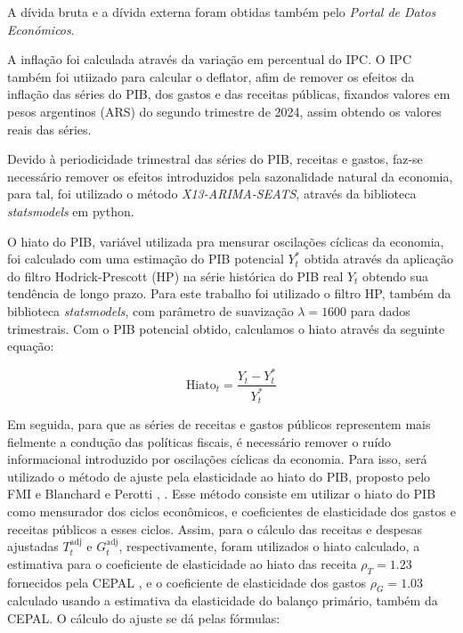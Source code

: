 \documentclass[a4paper, 12pt, openany, oneside, brazil]{abntex2}
\begin{document}
A dívida bruta e a dívida externa foram obtidas também pelo \textit{Portal de Datos Económicos}.

A inflação foi calculada através da variação em percentual do IPC. O IPC também foi utiizado para calcular o deflator, afim de remover os efeitos da inflação das séries do PIB, dos gastos e das receitas públicas, fixandos valores em pesos argentinos (ARS) do segundo trimestre de 2024, assim obtendo os valores reais das séries.

Devido à periodicidade trimestral das séries do PIB, receitas e gastos, faz-se necessário remover os efeitos introduzidos pela sazonalidade natural da economia, para tal, foi utilizado o método \textit{X13-ARIMA-SEATS}, através da biblioteca \textit{statsmodels} em python.

O hiato do PIB, variável utilizada pra mensurar oscilações cíclicas da economia, foi calculado com uma estimação do PIB potencial $Y^*_t$ obtida através da aplicação do filtro Hodrick-Prescott (HP) na série histórica do PIB real $Y_t$ obtendo sua tendência de longo prazo. Para este trabalho foi utilizado o filtro HP, também da biblioteca \textit{statsmodels}, com parâmetro de suavização $\lambda = 1600$ para dados trimestrais. Com o PIB potencial obtido, calculamos o hiato através da seguinte equação:

\begin{equation}
	\text{Hiato}_t = \frac{Y_t - Y^*_t}{Y^*_t}
\end{equation}

Em seguida, para que as séries de receitas e gastos públicos representem mais fielmente a condução das políticas fiscais, é necessário remover o ruído informacional introduzido por oscilações cíclicas da economia. Para isso, será utilizado o método de ajuste pela elasticidade ao hiato do PIB, proposto pelo FMI \cite{fedelino2009computing} e Blanchard e Perotti \cite{Blanchard2002}, \cite{Blanchard1990}. Esse método consiste em utilizar o hiato do PIB como mensurador dos ciclos econômicos, e coeficientes de elasticidade dos gastos e receitas públicos a esses ciclos. Assim, para o cálculo das receitas e despesas ajustadas $T^\text{adj}_t$ e $G^\text{adj}_t$, respectivamente, foram utilizados o hiato calculado, a estimativa para o coeficiente de elasticidade ao hiato das receita $\rho_T=1.23$ fornecidos pela CEPAL \cite{Martner2004}, e o coeficiente de elasticidade dos gastos $\rho_G=1.03$ calculado usando a estimativa da elasticidade do balanço primário, também da CEPAL. O cálculo do ajuste se dá pelas fórmulas:
\end{document}
